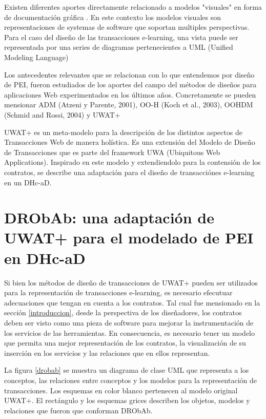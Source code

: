 \documentclass{llncs}
\begin{document}
Existen diferentes aportes  directamente relacionado a modelos "visuales" en forma de documentación gráfica \cite{5,10,12}. En este contexto los modelos visuales son representaciones de systemas de software que soportan multiples perspectivas. Para el caso del diseño de las transacciones e-learning, una vista puede ser representada por una series de diagramas pertenecientes a UML (Unified Modeling Language) 

Los antecedentes relevantes que se relacionan con lo que entendemos por diseño de PEI, fueron estudiados de los aportes del campo del métodos de diseños para aplicaciones Web experimentados en los últimos años. Concretamente se pueden mensionar ADM (Atzeni y Parente, 2001), OO-H (Koch et al., 2003), OOHDM (Schmid and Rossi, 2004) y UWAT+ 

UWAT+ es un meta-modelo para la descripción de los distintos aspectos de Transacciones Web de manera holística. Es una extensión del Modelo de Diseño de Transacciones que es parte del framework UWA (Ubiquitous Web Applications). Inspirado en este modelo y extendiendolo para la contensión de los contratos, se describe una adaptación para el diseño de transacciónes e-learning en un DHc-aD.

\section {DRObAb: una adaptación de UWAT+ para el modelado de PEI en DHc-aD}

Si bien los métodos de diseño de transacciones de UWAT+ pueden ser utilizados para la representación de transacciones e-learning, es necesario efecutuar adecuaciones que tengan en cuenta  a los contratos. Tal cual fue mensionado en la sección \ref{introduccion}, desde la perspectiva de los diseñadores, los contratos deben ser visto como una pieza de software para mejorar la instrumentación de los servicios de las herramientas. En consecuencia, es necesario tener un modelo que permita una mejor representación de los contratos, la visualización de su inserción en los servicios y las relaciones que en ellos representan. 


La figura \ref{drobab} se muestra un diagrama de clase UML que representa a los conceptos, las relaciones entre conceptos y los modelos para la representación de transacciones. Los esquemas en color blanco pertenecen al modelo original UWAT+. El rectángulo y los esquemas grices describen los objetos, modelos y relaciones que fueron que conforman DRObAb.
\end{document}
